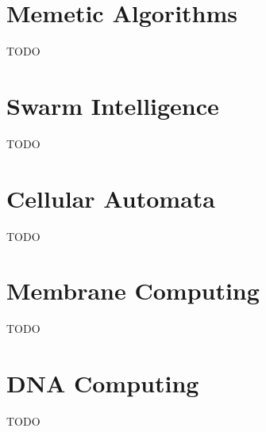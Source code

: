 \documentclass[a4paper]{article}
\begin{document}
\section{Memetic Algorithms}
\label{sec:ma}

TODO

\section{Swarm Intelligence}
\label{sec:swarm}

TODO

\section{Cellular Automata}
\label{sec:ca}

TODO

\section{Membrane Computing}
\label{sec:membrane}

TODO

\section{DNA Computing}
\label{sec:dna}

TODO
\end{document}
